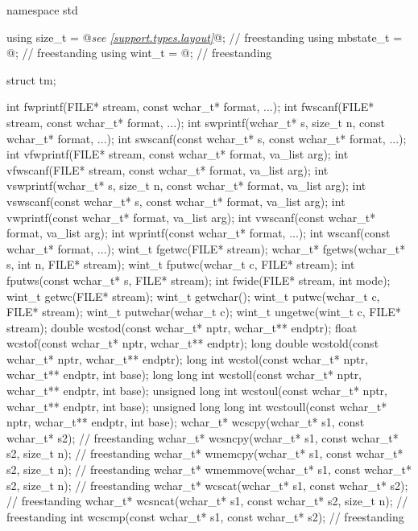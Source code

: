 \begin{codeblock}
namespace std {
  using size_t = @\textit{see \ref{support.types.layout}}@;                                             // freestanding
  using mbstate_t = @\seebelow@;                                          // freestanding
  using wint_t = @\seebelow@;                                             // freestanding

  struct tm;

  int fwprintf(FILE* stream, const wchar_t* format, ...);
  int fwscanf(FILE* stream, const wchar_t* format, ...);
  int swprintf(wchar_t* s, size_t n, const wchar_t* format, ...);
  int swscanf(const wchar_t* s, const wchar_t* format, ...);
  int vfwprintf(FILE* stream, const wchar_t* format, va_list arg);
  int vfwscanf(FILE* stream, const wchar_t* format, va_list arg);
  int vswprintf(wchar_t* s, size_t n, const wchar_t* format, va_list arg);
  int vswscanf(const wchar_t* s, const wchar_t* format, va_list arg);
  int vwprintf(const wchar_t* format, va_list arg);
  int vwscanf(const wchar_t* format, va_list arg);
  int wprintf(const wchar_t* format, ...);
  int wscanf(const wchar_t* format, ...);
  wint_t fgetwc(FILE* stream);
  wchar_t* fgetws(wchar_t* s, int n, FILE* stream);
  wint_t fputwc(wchar_t c, FILE* stream);
  int fputws(const wchar_t* s, FILE* stream);
  int fwide(FILE* stream, int mode);
  wint_t getwc(FILE* stream);
  wint_t getwchar();
  wint_t putwc(wchar_t c, FILE* stream);
  wint_t putwchar(wchar_t c);
  wint_t ungetwc(wint_t c, FILE* stream);
  double wcstod(const wchar_t* nptr, wchar_t** endptr);
  float wcstof(const wchar_t* nptr, wchar_t** endptr);
  long double wcstold(const wchar_t* nptr, wchar_t** endptr);
  long int wcstol(const wchar_t* nptr, wchar_t** endptr, int base);
  long long int wcstoll(const wchar_t* nptr, wchar_t** endptr, int base);
  unsigned long int wcstoul(const wchar_t* nptr, wchar_t** endptr, int base);
  unsigned long long int wcstoull(const wchar_t* nptr, wchar_t** endptr, int base);
  wchar_t* wcscpy(wchar_t* s1, const wchar_t* s2);                      // freestanding
  wchar_t* wcsncpy(wchar_t* s1, const wchar_t* s2, size_t n);           // freestanding
  wchar_t* wmemcpy(wchar_t* s1, const wchar_t* s2, size_t n);           // freestanding
  wchar_t* wmemmove(wchar_t* s1, const wchar_t* s2, size_t n);          // freestanding
  wchar_t* wcscat(wchar_t* s1, const wchar_t* s2);                      // freestanding
  wchar_t* wcsncat(wchar_t* s1, const wchar_t* s2, size_t n);           // freestanding
  int wcscmp(const wchar_t* s1, const wchar_t* s2);                     // freestanding
}
\end{codeblock}

